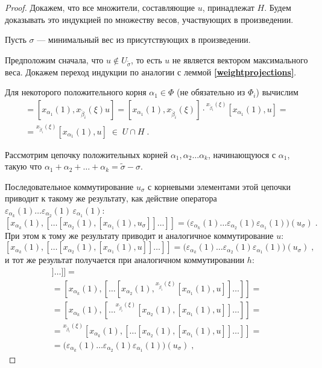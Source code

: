 \documentclass[12pt]{matmex-diploma}
\theoremstyle{mystyleni}
\theoremstyle{mystyle}
\newcommand\refb[1]{\textbf{\ref{#1}}}
\begin{document}
\begin{proof}
Докажем, что все множители, составляющие $u$, принадлежат $H$. Будем доказывать это индукцией по множеству весов, участвующих в произведении.

Пусть $\sigma$ --- минимальный вес из присутствующих в произведении.

Предположим сначала, что $u \notin U_{\widetilde\sigma}$, то есть $u$ не является вектором максимального веса. Докажем переход индукции по аналогии с леммой \refb{weightprojections}.

Для некоторого положительного корня $\alpha_1 \in \Phi$ (не обязательно из $\Phi_i$) вычислим
\begin{multline*}
[x_{\alpha_1}(1), h] = [x_{\alpha_1}(1), x_{\widetilde\beta_i}(\xi)u] =
[x_{\alpha_1}(1), x_{\widetilde\beta_i}(\xi)] \cdot {}^{x_{\widetilde\beta_i}(\xi)}[x_{\alpha_1}(1),u] =\\=
{}^{x_{\widetilde\beta_i}(\xi)}[x_{\alpha_1}(1),u] \; \in \; U \cap H \; .
\end{multline*}

Рассмотрим цепочку положительных корней $\alpha_1,\alpha_2 \ldots \alpha_k$, начинающуюся с $\alpha_1$, такую что $\alpha_1+\alpha_2+\ldots+\alpha_k=\widetilde\sigma-\sigma$. 

Последовательное коммутирование $u_\sigma$ с корневыми элементами этой цепочки приводит к такому же результату, как действие оператора $\varepsilon_{\alpha_k}(1)\ldots\varepsilon_{\alpha_2}(1)\,\varepsilon_{\alpha_1}(1)$:
$$ [x_{\alpha_k}(1),[\ldots[x_{\alpha_2}(1),[x_{\alpha_1}(1),u_\sigma]]\ldots]] =
\big(\varepsilon_{\alpha_k}(1)\ldots\varepsilon_{\alpha_2}(1)\varepsilon_{\alpha_1}(1)\big)(u_\sigma) \;.$$
При этом к тому же результату приводит и аналогичное коммутирование $u$:
$$ [x_{\alpha_k}(1),[\ldots[x_{\alpha_2}(1),[x_{\alpha_1}(1),u]]\ldots]] =
\big(\varepsilon_{\alpha_k}(1)\ldots\varepsilon_{\alpha_2}(1)\varepsilon_{\alpha_1}(1)\big)(u_\sigma) \;,$$
и тот же результат получается при аналогичном коммутировании $h$:
\begin{multline*}
[x_{\alpha_k}(1),[\ldots[x_{\alpha_2}(1),[x_{\alpha_1}(1),h]]\ldots]] =\\=
[x_{\alpha_k}(1),[\ldots[x_{\alpha_2}(1),{}^{x_{\widetilde\beta_i}(\xi)}[x_{\alpha_1}(1),u]]\ldots]] =\\=
[x_{\alpha_k}(1),[\ldots{}^{x_{\widetilde\beta_i}(\xi)}[x_{\alpha_2}(1),[x_{\alpha_1}(1),u]]\ldots]] =\\=
{}^{x_{\widetilde\beta_i}(\xi)}[x_{\alpha_k}(1),[\ldots[x_{\alpha_2}(1),[x_{\alpha_1}(1),u]]\ldots]] =\\=
\big(\varepsilon_{\alpha_k}(1)\ldots\varepsilon_{\alpha_2}(1)\varepsilon_{\alpha_1}(1)\big)(u_\sigma) \;,
\end{multline*}


\end{proof}
\end{document}
